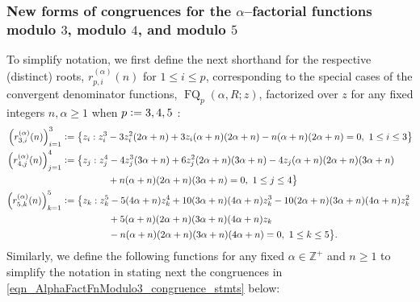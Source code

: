 \documentclass[12pt,reqno]{article}
\numberwithin{sfootnote}{section}
\numberwithin{equation}{section}
\theoremstyle{DefaultTheoremStyle}
\theoremstyle{definition}
\newcommand{\cf}[0]{cf.\ }
\newcommand{\defequals}{\ensuremath{\vcentcolon=}}
\newcommand{\ConvFQ}[4]{\ensuremath{\FQ_{#1}\left(#2, #3; #4\right)}}
\DeclareMathOperator{\FQ}{FQ}
\begin{document}
\subsubsection{New forms of congruences for the $\alpha$--factorial functions 
               modulo $3$, modulo $4$, and modulo $5$} 
To simplify notation, we first define the next shorthand for the respective 
(distinct) roots, $r_{p,i}^{(\alpha)}(n)$ for $1 \leq i \leq p$, 
corresponding to the special cases of the convergent denominator 
functions, $\ConvFQ{p}{\alpha}{R}{z}$, 
factorized over $z$ for any fixed integers $n, \alpha \geq 1$ 
when $p \defequals 3, 4, 5$ 
\citep[\S 1.11(iii); \cf \S 4.43]{NISTHB}: 
\begin{align} 
\notag 
\left( r_{3,i}^{(\alpha)}(n) \right)_{i=1}^{3} & \defequals 
     \left\{ z_i : z_i^3 -3 z_i^2 (2 \alpha +n)+3 z_i (\alpha +n) 
     (2 \alpha +n) - n (\alpha +n) (2 \alpha +n) = 0,\ 
     1 \leq i \leq 3 \right\} \\ 
\notag 
\left( r_{4,j}^{(\alpha)}(n) \right)_{j=1}^{4} & \defequals 
     \bigl\{ z_j : 
     z_j^4 - 4 z_j^3 (3 \alpha +n) + 
     6 z_j^2 (2 \alpha +n) (3 \alpha +n) - 
     4 z_j (\alpha +n) (2 \alpha +n) (3 \alpha +n) \\ 
\notag 
     & \phantom{\defequals \bigl( z_j : z_j^4\ } + 
     n (\alpha +n) (2 \alpha +n) (3 \alpha +n) = 0,\ 
     1 \leq j \leq 4 \bigr\} \\ 
\notag 
\left( r_{5,k}^{(\alpha)}(n) \right)_{k=1}^{5} & \defequals 
     \bigl\{ z_k : 
     z_k^5 - 5 (4 \alpha + n) z_k^4 + 
     10 (3 \alpha + n) (4 \alpha + n) z_k^3 - 
     10 (2 \alpha + n) (3 \alpha + n) (4 \alpha + n) z_k^2 \\ 
\notag 
     & \phantom{\defequals \bigl( z_k : z_k^5\ } + 
     5 (\alpha + n) (2 \alpha + n) (3 \alpha + n) (4 \alpha + n) z_k \\ 
\label{eqn_cor_AlphaFactMod3_orig_roots_eqn} 
     & \phantom{\defequals \bigl( z_k : z_k^5\ } - 
     n (\alpha + n) (2 \alpha + n) (3 \alpha + n) (4 \alpha + n) = 0,\ 
     1 \leq k \leq 5 \bigr\}. 
\end{align} 
Similarly, we define the following functions for any fixed 
$\alpha \in \mathbb{Z}^{+}$ and $n \geq 1$ to 
simplify the notation in stating next the congruences in 
\eqref{eqn_AlphaFactFnModulo3_congruence_stmts} below: 
\newcommand{\rootri}[2]{\ensuremath{r_{#1,#2}^{(-\alpha)}(n)}} 
\end{document}

